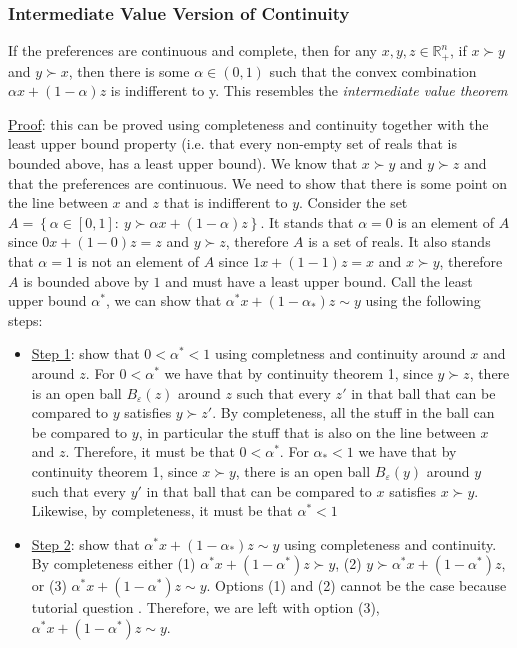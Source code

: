 \documentclass{article}
\begin{document}
\subsubsection{Intermediate Value Version of Continuity}
If the preferences are continuous and complete, then for any $x, y, z \in \mathbb{R}_{+}^{n}$, if $x \succ y$ and $y \succ x$, then there is some $\alpha \in (0,1)$ such that the convex combination $\alpha x + (1- \alpha)z$ is indifferent to y. This resembles the \textit{intermediate value theorem} \par \vspace{0.3em}
  \underline{Proof}: this can be proved using completeness and continuity together with the least upper bound property (i.e. that every non-empty set of reals that is bounded above, has a least upper bound). We know that $x \succ y$ and $y \succ z$ and that the preferences are continuous. We need to show that there is some point on the line between $x$ and $z$ that is indifferent to $y$. Consider the set $A = \left\{ \alpha \in [0,1]: \ y \succ \alpha x + (1- \alpha)z \right\}$. It stands that $\alpha = 0$ is an element of $A$ since $0x + (1 - 0)z = z$ and $y \succ z$, therefore $A$ is a set of reals. It also stands that $\alpha = 1$ is not an element of $A$ since $1x + (1-1)z = x$ and $x \succ y$, therefore $A$ is bounded above by $1$ and must have a least upper bound. Call the least upper bound $\alpha^{*}$, we can show that $\alpha^{*}x + (1 - \alpha_{*})z \sim y$ using the following steps:
  \begin{itemize}
    \item  \underline{Step 1}: show that $0 < \alpha^{*} < 1$ using completness and continuity around $x$ and around $z$. For $0 < \alpha^{*}$ we have that by continuity theorem 1, since $y \succ z$, there is an open ball $B_{\varepsilon}(z)$ around $z$ such that every $z'$ in that ball that can be compared to $y$ satisfies $y \succ z'$. By completeness, all the stuff in the ball can be compared to $y$, in particular the stuff that is also on the line between $x$ and $z$. Therefore, it must be that $0 < \alpha^{*}$. For $\alpha_{*} < 1$ we have that by continuity theorem 1, since $x \succ y$, there is an open ball $B_{\varepsilon}(y)$ around $y$ such that every $y'$ in that ball that can be compared to $x$ satisfies $x \succ y$. Likewise, by completeness, it must be that $\alpha^{*} < 1$
    \item  \underline{Step 2}: show that $\alpha^{*}x + (1 - \alpha_{*})z \sim y$ using completeness and continuity. By completeness either (1) $\alpha^{*}x + (1-\alpha^{*})z \succ y$, (2) $y \succ \alpha^{*}x + (1-\alpha^{*})z$, or (3) $\alpha^{*}x + (1-\alpha^{*})z \sim y$. Options (1) and (2) cannot be the case because \begingroup\color{blue} tutorial question \endgroup. Therefore, we are left with option (3), $\alpha^{*}x + (1-\alpha^{*})z \sim y$.
  \end{itemize}
\end{document}
